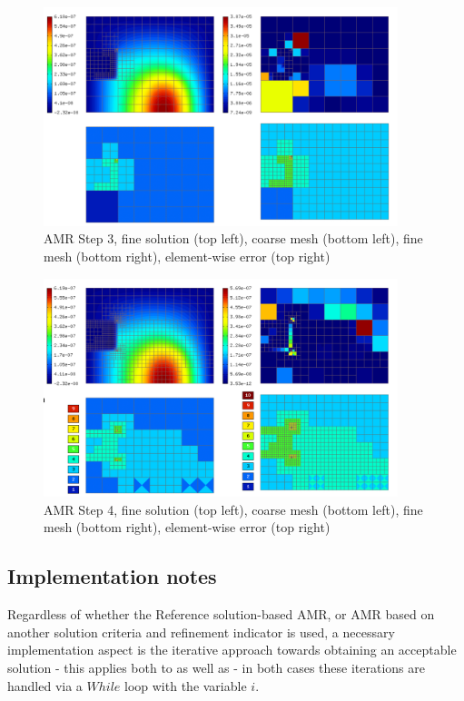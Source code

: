 \vspace{-4mm}
\begin{figure}[H]
	\begin{center}
		\includegraphics[width=0.92\textwidth]{img/adapt/ref/3.jpg}
		\caption{AMR Step 3, fine solution (top left), coarse mesh (bottom left), fine mesh (bottom right), element-wise error (top right)}
	\label{figure:amrRef3}
	\end{center}
\end{figure}
\vspace{-4mm}
\begin{figure}[H]
	\begin{center}
		\includegraphics[width=0.92\textwidth]{img/adapt/ref/4.jpg}
		\caption{AMR Step 4, fine solution (top left), coarse mesh (bottom left), fine mesh (bottom right), element-wise error (top right)}
	\label{figure:amrRef4}
	\end{center}
\end{figure}
\vspace{-4mm}

\subsection{Implementation notes}
Regardless of whether the Reference solution-based AMR, or AMR based on another solution criteria and refinement indicator is used, a necessary implementation aspect is the iterative approach towards obtaining an acceptable solution - this applies both to  as well as  - in both cases these iterations are handled via a $While$ loop with the variable $i$.

